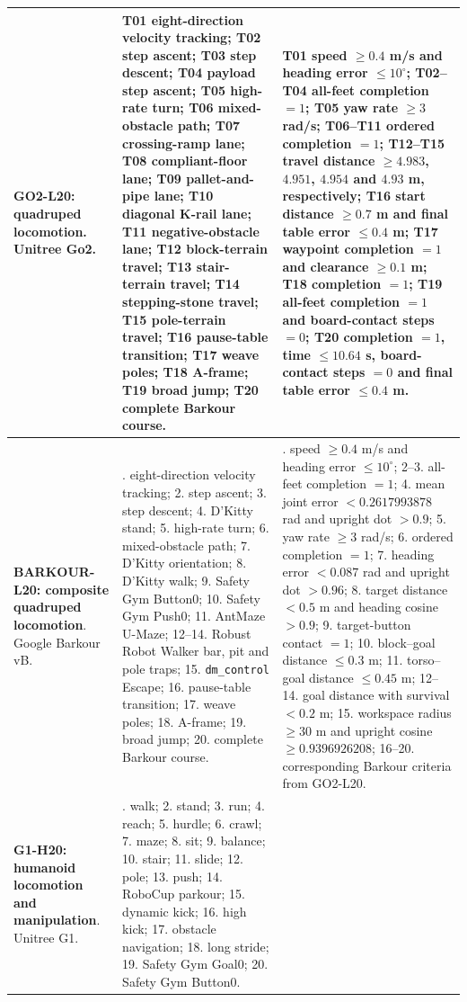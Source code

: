 \begin{landscape}
\begin{longtable}{@{}>{\raggedright\arraybackslash}p{47mm}>{\raggedright\arraybackslash}p{85mm}>{\raggedright\arraybackslash}p{84mm}@{}}
\midrule
\textbf{GO2-L20: quadruped locomotion}. Unitree Go2. &
T01 eight-direction velocity tracking; T02 step ascent; T03 step descent; T04 payload step ascent; T05 high-rate turn; T06 mixed-obstacle path; T07 crossing-ramp lane; T08 compliant-floor lane; T09 pallet-and-pipe lane; T10 diagonal K-rail lane; T11 negative-obstacle lane; T12 block-terrain travel; T13 stair-terrain travel; T14 stepping-stone travel; T15 pole-terrain travel; T16 pause-table transition; T17 weave poles; T18 A-frame; T19 broad jump; T20 complete Barkour course. &
T01 speed $\geq 0.4$ m/s and heading error $\leq 10^\circ$; T02--T04 all-feet completion $= 1$; T05 yaw rate $\geq 3$ rad/s; T06--T11 ordered completion $= 1$; T12--T15 travel distance $\geq 4.983$, $4.951$, $4.954$ and $4.93$ m, respectively; T16 start distance $\geq 0.7$ m and final table error $\leq 0.4$ m; T17 waypoint completion $= 1$ and clearance $\geq 0.1$ m; T18 completion $= 1$; T19 all-feet completion $= 1$ and board-contact steps $= 0$; T20 completion $= 1$, time $\leq 10.64$ s, board-contact steps $= 0$ and final table error $\leq 0.4$ m. \\
\midrule
\textbf{BARKOUR-L20: composite quadruped locomotion}. Google Barkour vB. &
1. eight-direction velocity tracking; 2. step ascent; 3. step descent; 4. D'Kitty stand; 5. high-rate turn; 6. mixed-obstacle path; 7. D'Kitty orientation; 8. D'Kitty walk; 9. Safety Gym Button0; 10. Safety Gym Push0; 11. AntMaze U-Maze; 12--14. Robust Robot Walker bar, pit and pole traps; 15. \texttt{dm\_control} Escape; 16. pause-table transition; 17. weave poles; 18. A-frame; 19. broad jump; 20. complete Barkour course. &
1. speed $\geq 0.4$ m/s and heading error $\leq 10^\circ$; 2--3. all-feet completion $= 1$; 4. mean joint error $< 0.2617993878$ rad and upright dot $> 0.9$; 5. yaw rate $\geq 3$ rad/s; 6. ordered completion $= 1$; 7. heading error $< 0.087$ rad and upright dot $> 0.96$; 8. target distance $< 0.5$ m and heading cosine $> 0.9$; 9. target-button contact $= 1$; 10. block--goal distance $\leq 0.3$ m; 11. torso--goal distance $\leq 0.45$ m; 12--14. goal distance with survival $< 0.2$ m; 15. workspace radius $\geq 30$ m and upright cosine $\geq 0.9396926208$; 16--20. corresponding Barkour criteria from GO2-L20. \\
\midrule
\textbf{G1-H20: humanoid locomotion and manipulation}. Unitree G1. &
1. walk; 2. stand; 3. run; 4. reach; 5. hurdle; 6. crawl; 7. maze; 8. sit; 9. balance; 10. stair; 11. slide; 12. pole; 13. push; 14. RoboCup parkour; 15. dynamic kick; 16. high kick; 17. obstacle navigation; 18. long stride; 19. Safety Gym Goal0; 20. Safety Gym Button0. &

\end{longtable}
\end{landscape}
